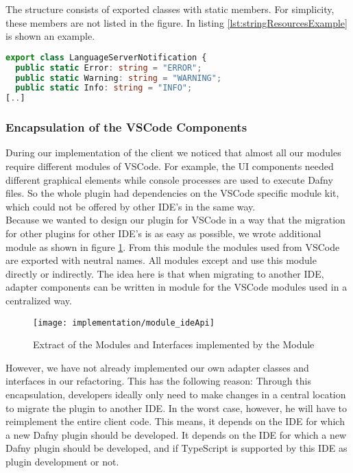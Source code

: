 The structure consists of exported classes with static members. For simplicity, these members are not listed in the figure.
In listing \ref{lst:stringResourcesExample} is shown an example.

\begin{lstlisting}[language=typescript, caption={Excerpt from class \code{LanguageServerNotification}}, captionpos=b, label={lst:stringResourcesExample}]
export class LanguageServerNotification {
  public static Error: string = "ERROR";
  public static Warning: string = "WARNING";
  public static Info: string = "INFO";
[..]
\end{lstlisting}

\subsubsection{Encapsulation of the VSCode Components}
During our implementation of the client we noticed that almost all our modules require different modules of VSCode.
For example, the UI components needed different graphical elements while console processes are used to execute Dafny files.
So the whole plugin had dependencies on the VSCode specific module kit,
which could not be offered by other IDE's in the same way. \\

Because we wanted to design our plugin for VSCode in a way that the migration for other plugins
for other IDE's is as easy as possible, we wrote additional module  as shown in figure \ref{fig:packageIdeApi}.
From this module the modules used from VSCode are exported with neutral names.
All modules except  and  use this module directly or indirectly.
The idea here is that when migrating to another IDE, adapter components can be written in module 
for the VSCode modules used in a centralized way.

\begin{figure}[H]
    \centering
    \texttt{[image: implementation/module\_ideApi]}
    \caption{Extract of the Modules and Interfaces implemented by the Module }
    \label{fig:packageIdeApi}
\end{figure}

However, we have not already implemented our own adapter classes and interfaces in our refactoring.
This has the following reason:
Through this encapsulation, developers ideally only need to make changes in a central location to migrate the plugin to another IDE.
In the worst case, however, he will have to reimplement the entire client code.
This means, it depends on the IDE for which a new Dafny plugin should be developed.
It depends on the IDE for which a new Dafny plugin should be developed,
and if TypeScript is supported by this IDE as plugin development or not.\\

